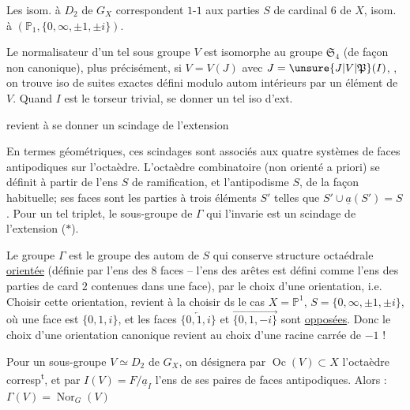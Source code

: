 Les   isom. à $D_2$ de $G_X$ correspondent $1$-$1$ aux parties $S$ de cardinal $6$ de $X$, isom. à $(\mathbb P_1,\{0,\infty,\pm1,\pm i\})$.

Le normalisateur d'un tel  sous groupe $V$  est isomorphe au groupe  $\mathfrak S_4$ (de façon non canonique), plus précisément, si $V=V(J)$ avec $J=\unsure{J|V|\mathfrak P}(I)$, , on trouve  iso de suites exactes
défini modulo autom intérieurs par un élément de $V$. Quand $I$ est le torseur trivial, se donner un tel  iso d'ext.

revient à se donner un scindage de l'extension

En termes géométriques, ces scindages sont associés aux quatre systèmes de  faces antipodiques sur l'octaèdre.  L'octaèdre combinatoire (non orienté a priori) se définit à partir de l'ens $S$ de ramification, et l'antipodisme  $S$, de la façon habituelle; ses faces sont les parties à trois éléments  $S'$ telles que $S'\cup\underline a(S')=S$. Pour un tel triplet, le sous-groupe de $\Gamma$ qui l'invarie est un scindage de l'extension ($*$).

Le groupe $\Gamma$ est le groupe des autom de $S$ qui conserve  structure octaédrale \uline{orientée} (définie par l'ens  des $8$ faces  -- l'ens des arêtes  est défini comme l'ens des parties de card $2$ contenues dans une face), par le choix d'une orientation, i.e. Choisir cette orientation, revient  à la choisir ds le cas  $X=\mathbb P^1$, $S=\{0,\infty,\pm1,\pm i\}$, où une face est $\{0,1,i\}$, et les faces  $\overleftarrow{\{0,1,i\}}$ et $\overrightarrow{\{0,1,-i\}}$ sont \uline{opposées}. Donc le choix d'une orientation canonique revient au choix d'une racine carrée de $-1$ !

Pour un sous-groupe $V\simeq D_2$ de $G_X$, on désignera par $\operatorname{Oc}(V)\subset X$ l'octaèdre corresp\textsuperscript{t}, et par $I(V)=F/\underline a_I$ l'ens de ses paires de faces antipodiques. Alors : $\Gamma(V)=\operatorname{Nor}_{G}(V)$
